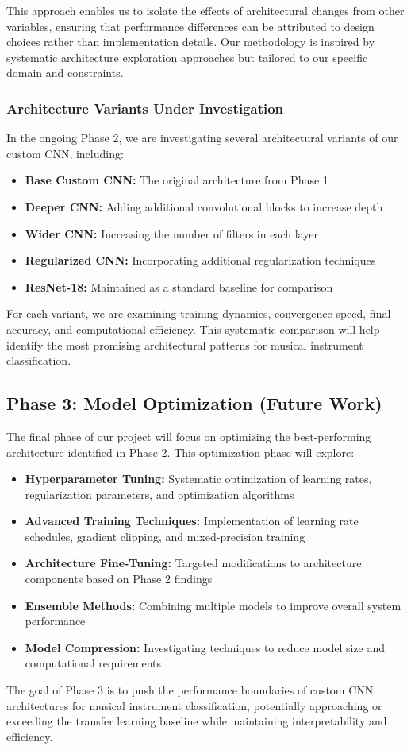 This approach enables us to isolate the effects of architectural changes from other variables, ensuring that performance differences can be attributed to design choices rather than implementation details. Our methodology is inspired by systematic architecture exploration approaches \cite{zoph2018learning, tan2019efficientnet} but tailored to our specific domain and constraints.

\subsubsection{Architecture Variants Under Investigation}
In the ongoing Phase 2, we are investigating several architectural variants of our custom CNN, including:
\begin{itemize}
    \item \textbf{Base Custom CNN:} The original architecture from Phase 1
    \item \textbf{Deeper CNN:} Adding additional convolutional blocks to increase depth
    \item \textbf{Wider CNN:} Increasing the number of filters in each layer
    \item \textbf{Regularized CNN:} Incorporating additional regularization techniques
    \item \textbf{ResNet-18:} Maintained as a standard baseline for comparison
\end{itemize}

For each variant, we are examining training dynamics, convergence speed, final accuracy, and computational efficiency. This systematic comparison will help identify the most promising architectural patterns for musical instrument classification.


\subsection{Phase 3: Model Optimization (Future Work)}
The final phase of our project will focus on optimizing the best-performing architecture identified in Phase 2. This optimization phase will explore:
\begin{itemize}
    \item \textbf{Hyperparameter Tuning:} Systematic optimization of learning rates, regularization parameters, and optimization algorithms
    \item \textbf{Advanced Training Techniques:} Implementation of learning rate schedules, gradient clipping, and mixed-precision training
    \item \textbf{Architecture Fine-Tuning:} Targeted modifications to architecture components based on Phase 2 findings
    \item \textbf{Ensemble Methods:} Combining multiple models to improve overall system performance
    \item \textbf{Model Compression:} Investigating techniques to reduce model size and computational requirements
\end{itemize}

The goal of Phase 3 is to push the performance boundaries of custom CNN architectures for musical instrument classification, potentially approaching or exceeding the transfer learning baseline while maintaining interpretability and efficiency.
